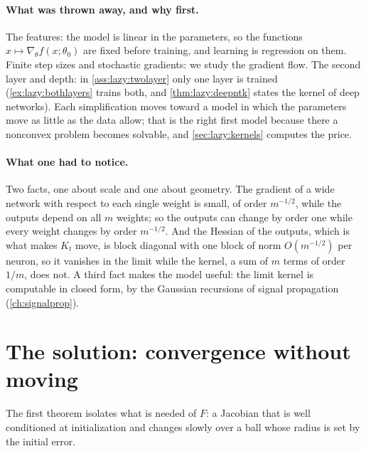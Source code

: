 \begin{refsection}
\paragraph{What was thrown away, and why first.} The features: the model is linear in the parameters, so the functions $x\mapsto\nabla_\theta f(x;\theta_0)$ are fixed before training, and learning is regression on them. Finite step sizes and stochastic gradients: we study the gradient flow. The second layer and depth: in \cref{ass:lazy:twolayer} only one layer is trained (\cref{ex:lazy:bothlayers} trains both, and \cref{thm:lazy:deepntk} states the kernel of deep networks). Each simplification moves toward a model in which the parameters move as little as the data allow; that is the right first model because there a nonconvex problem becomes solvable, and \cref{sec:lazy:kernels} computes the price.

\paragraph{What one had to notice.} Two facts, one about scale and one about geometry. The gradient of a wide network with respect to each single weight is small, of order $m^{-1/2}$, while the outputs depend on all $m$ weights; so the outputs can change by order one while every weight changes by order $m^{-1/2}$. And the Hessian of the outputs, which is what makes $K_t$ move, is block diagonal with one block of norm $O(m^{-1/2})$ per neuron, so it vanishes in the limit while the kernel, a sum of $m$ terms of order $1/m$, does not. A third fact makes the model useful: the limit kernel is computable in closed form, by the Gaussian recursions of signal propagation (\cref{ch:signalprop}).

\section{The solution: convergence without moving}\label{sec:lazy:convergence}

The first theorem isolates what is needed of $F$: a Jacobian that is well conditioned at initialization and changes slowly over a ball whose radius is set by the initial error.


\end{refsection}
